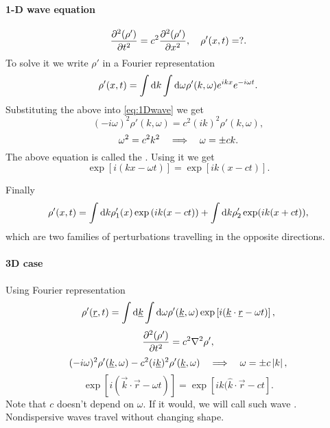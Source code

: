 \documentclass[../main.tex]{subfiles}
\begin{document}
    \paragraph{1-D wave equation}
    \begin{equation}
      \frac{\partial^2 (\rho')}{\partial t ^ 2} = c^2 \frac{\partial^2 (\rho')}{\partial x ^ 2}, \quad \rho'(x, t) = ?.
      \label{eq:1Dwave}
    \end{equation}
    To solve it we write $\rho'$ in a Fourier representation
    \begin{displaymath}
      \rho'(x,t) = \int\mathrm{d} k \int \mathrm{d} \omega \rho'(k, \omega) e^{ik x} e^{-i\omega t}.
    \end{displaymath}
    Substituting the above into \ref{eq:1Dwave} we get
    \begin{displaymath}
      (- i \omega) ^2 \rho'(k, \omega) = c^2 (i k)^2 \rho'(k,\omega),
    \end{displaymath}
    \begin{displaymath}
      \omega^2 = c^2 k^2 \quad \Longrightarrow \quad \omega = \pm c k.
    \end{displaymath}
    The above equation is called the .
    Using it we get
    \begin{displaymath}
      \exp\left[ i (k x - \omega t) \right] = \exp\left[ i k (x - c t)\right].
    \end{displaymath}

    Finally
    \begin{displaymath}
      \rho'(x, t) = \int \mathrm{d} k \rho_1'(x) \exp\left( i k (x - c t) \right) + \int \mathrm{d} k \rho_2' \exp(ik ( x + ct)),
    \end{displaymath}
    which are two families of perturbations travelling in the opposite directions.

    \paragraph{3D case}

    Using Fourier representation
    \begin{displaymath}
      \rho'(\underline{r}, t) = \int \mathrm{d} \underline{k} \int \mathrm{d} \omega \rho'(\underline{k}, \omega) \exp\left[ i( \underline{k} \cdot \underline{r} - \omega t )\right],
    \end{displaymath}
    \begin{displaymath}
      \frac{\partial^2 (\rho')}{\partial t ^ 2} = c^2 \nabla^2 \rho',
    \end{displaymath}
    \begin{displaymath}
      (- i\omega)^2 \rho'(\underline{k}, \omega) - c^2 (i\underline{k})^2 \rho'(\underline{k}, \omega) \quad \Longrightarrow \quad \omega = \pm c \left| k\right|,
    \end{displaymath}
    \begin{displaymath}
      \exp\left[ i(\vec k \cdot \vec r - \omega t) \right] = \exp\left[ i k ( \hat{k} \cdot \vec r - c t \right].
    \end{displaymath}
    Note that $c$ doesn't depend on $\omega$. 
    If it would, we will call such wave .
    Nondispersive waves travel without changing shape.
\end{document}
